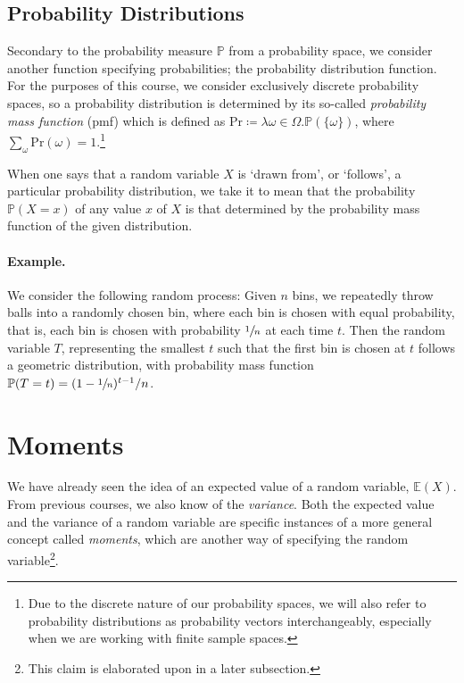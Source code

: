 	\subsection{Probability Distributions}
		
		Secondary to the probability measure $\mathbb{P}$ from a probability space, we consider another function specifying 
		probabilities; the probability distribution function. For the purposes of this course, we consider exclusively discrete 
		probability spaces, so a probability distribution is determined by its so-called \emph{probability mass function} (pmf) 
		which is defined as $\mathrm{Pr} \coloneqq \lambda \omega \in \Omega. \mathbb{P}(\{\omega\})$, where $\sum_\omega 
		\mathrm{Pr}(\omega) = 1$.\footnote{Due to the discrete nature of our probability spaces, we will also refer to probability 
		distributions as probability vectors interchangeably, especially when we are working with finite sample spaces.}
		\par
		When one says that a random variable $X$ is `drawn from', or `follows', a particular probability distribution, we take it 
		to mean that the probability $\mathbb{P}(X=x)$ of any value $x$ of $X$ is that determined by the probability mass function 
		of the given distribution.
		
		\paragraph{Example.} We consider the following random process: Given $n$ bins, we repeatedly throw balls into a randomly 
		chosen bin, where each bin is chosen with equal probability, that is, each bin is chosen with probability $\sfrac{1}{n}$
		at each time $t$. Then the random variable $T$, representing the smallest $t$ such that the first bin is chosen at $t$ 
		follows a geometric distribution, with probability mass function $\mathbb{P}(T=t) = (1- \sfrac{1}{n})^{t-1} / n$. 

	
	\section{Moments}

		We have already seen the idea of an expected value of a random variable, $\mathbb{E}(X)$. From previous courses, we also 
		know of the \emph{variance}. Both the expected value and the variance of a random variable are specific instances of a more
		general concept called \emph{moments}, which are another way of specifying the random variable\footnote{This claim is 
		elaborated upon in a later subsection.}. 

